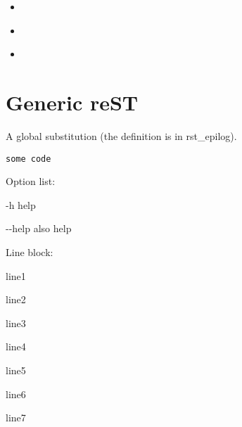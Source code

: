 \documentclass[letterpaper,10pt,english]{sphinxmanual}
\begin{document}
\begin{SphinxShadowBox}
\begin{itemize}
\begin{itemize}
\item {} 
\label{markup:id22}{\hyperref[markup:o\string-some\string-strange\string-characters]{}}

\item {} 
\label{markup:id23}{\hyperref[markup:only\string-directive]{}}

\item {} 
\label{markup:id24}{\hyperref[markup:any\string-role]{}}

\end{itemize}

\end{itemize}
\end{SphinxShadowBox}


\section{Generic reST}
\label{markup:generic-rest}
A global substitution (the definition is in rst\_epilog).
\label{markup:label}
\def\SphinxLiteralBlockLabel{\label{markup:label}}
\begin{Verbatim}[commandchars=\\\{\}]
some code
\end{Verbatim}
\let\SphinxLiteralBlockLabel\empty

Option list:
\begin{optionlist}{3cm}
\item [-h]  
help
\item [-{-}help]  
also help
\end{optionlist}

Line block:

\begin{DUlineblock}{0em}
\item[] line1
\item[]
\begin{DUlineblock}{\DUlineblockindent}
\item[] line2
\item[]
\begin{DUlineblock}{\DUlineblockindent}
\item[] line3
\item[]
\begin{DUlineblock}{\DUlineblockindent}
\item[] line4
\end{DUlineblock}
\end{DUlineblock}
\item[] line5
\end{DUlineblock}
\item[] line6
\item[]
\begin{DUlineblock}{\DUlineblockindent}
\item[] line7
\end{DUlineblock}
\end{DUlineblock}
\end{document}
